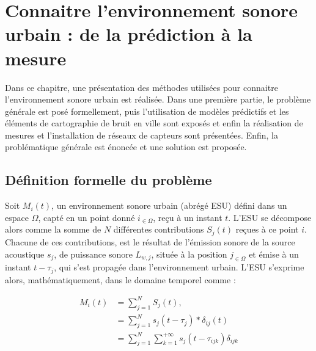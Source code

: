 
\chapter{Connaitre l'environnement sonore urbain : de la prédiction à la mesure}\label{chap:modele}
\thispagestyle{empty}

Dans ce chapitre, une présentation des méthodes utilisées pour connaitre l'environnement sonore urbain est réalisée. Dans une première partie, le problème générale est posé formellement, puis l'utilisation de modèles prédictifs et les éléments de cartographie de bruit en ville sont exposés et enfin la réalisation de mesures et l'installation de réseaux de capteurs sont présentées. Enfin, la problématique générale est énoncée et une solution est proposée.

\section{Définition formelle du problème}

Soit $M_{i}(t)$, un environnement sonore urbain (abrégé ESU) défini dans un espace $\Omega$, capté en un point donné $i_{\in \Omega}$, reçu à un instant $t$. L'ESU se décompose alors comme la somme de $N$ différentes contributions $S_j(t)$ reçues à ce point $i$. Chacune de ces contributions, est le résultat de l'émission sonore de la source acoustique $s_j$, de puissance sonore $L_{w,j}$, située à la position $j_{\in \Omega}$ et émise à un instant $t-\tau_j$,  qui s'est propagée dans l'environnement urbain. L'ESU s'exprime alors, mathématiquement, dans le domaine temporel comme : 

\begin{subequations}\label{eq:esu_formel}
\begin{align}
M_i(t) &= \sum_{j = 1}^{N}S_j(t), \\
 & = \sum_{j = 1}^{N} s_j(t-\tau_j) \ast \delta_{ij}(t) \label{eq:convolution_ESU}\\
 & = \sum_{j = 1}^{N} \sum_{k = 1}^{+\infty} s_j(t-\tau_{ijk}) \delta_{ijk}\label{eq:propagation}
\end{align}
\end{subequations}


